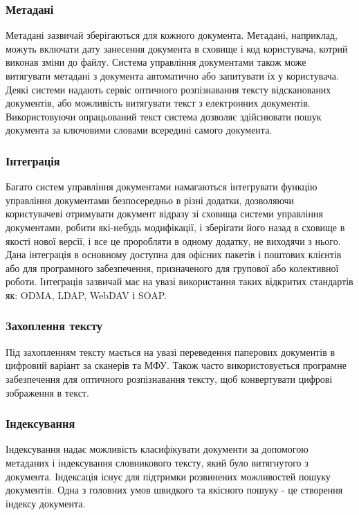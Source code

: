 \subsubsection{Метадані}
Метадані зазвичай зберігаються для кожного документа. 
Метадані, наприклад, можуть включати дату занесення документа в сховище і код користувача, котрий виконав зміни до файлу. 
Система управління документами також може витягувати метадані з документа автоматично або запитувати їх у користувача. 
Деякі системи надають сервіс оптичного розпізнавання тексту відсканованих документів, або можливість витягувати текст з електронних документів. 
Використовуючи опрацьований текст система дозволяє здійснювати пошук документа за ключовими словами всередині самого документа.

\subsubsection{Інтеграція }
Багато систем управління документами намагаються інтегрувати функцію управління документами безпосередньо в різні додатки, дозволяючи користувачеві отримувати документ відразу зі сховища системи управління документами, робити які-небудь модифікації, і зберігати його назад в сховище в якості нової версії, і все це проробляти в одному додатку, не виходячи з нього. 
Дана інтеграція в основному доступна для офісних пакетів і поштових клієнтів або для програмного забезпечення, призначеного для групової або колективної роботи. 
Інтеграція зазвичай має на увазі використання таких відкритих стандартів як: ODMA, LDAP, WebDAV і SOAP.

\subsubsection{Захоплення тексту}
Під захопленням тексту мається на увазі переведення паперових документів в цифровий варіант за сканерів та МФУ.
Також часто використовується програмне забезпечення для оптичного розпізнавання тексту, щоб конвертувати цифрові зображення в текст.

\subsubsection{Індексування}
Індексування надає можливість класифікувати документи за допомогою метаданих і індексування словникового тексту, який було витягнутого з документа.
Індексація існує для підтримки розвинених можливостей пошуку документів. 
Одна з головних умов швидкого та якісного пошуку - це створення індексу документа.

